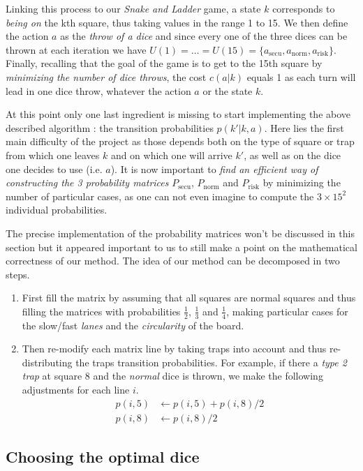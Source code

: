 Linking this process to our \textit{Snake and Ladder} game,
a state $k$ corresponds to \emph{being on} the kth square,
thus taking values in the range 1 to 15.
We then define the action $a$ as the \emph{throw of a dice}
and since every one of the three dices can be thrown at each
iteration we have $U(1) = \dots = U(15) = \{a_{\text{secu}},
a_{\text{norm}}, a_{\text{risk}}\}$.
Finally, recalling that the goal of the game is to get to
the 15th square by \emph{minimizing the number of dice throws},
the cost $c(a|k)$ equals 1 as each turn will lead in one dice
throw, whatever the action $a$ or the state $k$. 

At this point only one last ingredient is missing to start implementing
the above described algorithm : the transition probabilities $p(k'|k,a)$.
Here lies the first main difficulty of the project as those depends
both on the type of square or trap from which one leaves $k$ and
on which one will arrive $k'$, as well as on the dice one
decides to use (i.e. $a$).
It is now important to \emph{find an efficient way of constructing
the 3 probability matrices} $P_{\text{secu}}$, $P_{\text{norm}}$
and $P_{\text{risk}}$ by minimizing the number of particular cases,
as one can not even imagine to compute the $3\times 15^2$ individual probabilities.

The precise implementation of the probability matrices won't be
discussed in this section but it appeared important to us
to still make a point on the mathematical correctness of our method.
The idea of our method can be decomposed in two steps.
\begin{enumerate}
  \item First fill the matrix by assuming that
  all squares are normal squares and thus filling the matrices
  with probabilities $\frac{1}{2}$, $\frac{1}{3}$ and $\frac{1}{4}$,
  making particular cases for the slow/fast \emph{lanes}
  and the \emph{circularity} of the board.
  \item Then re-modify each matrix line by taking traps into account
  and thus re-distributing the traps transition probabilities.
  For example, if there a \emph{type 2 trap} at square 8 
  and the \emph{normal} dice is thrown, we make the following adjustments
  for each line $i$.
  \begin{align*}
    p(i,5) &\leftarrow p(i,5) + p(i,8)/2 \\
     p(i,8) &\leftarrow p(i,8)/2
  \end{align*}
\end{enumerate}


\subsection{Choosing the optimal dice} %
\label{sub:choosing_the_optimal_dice}


